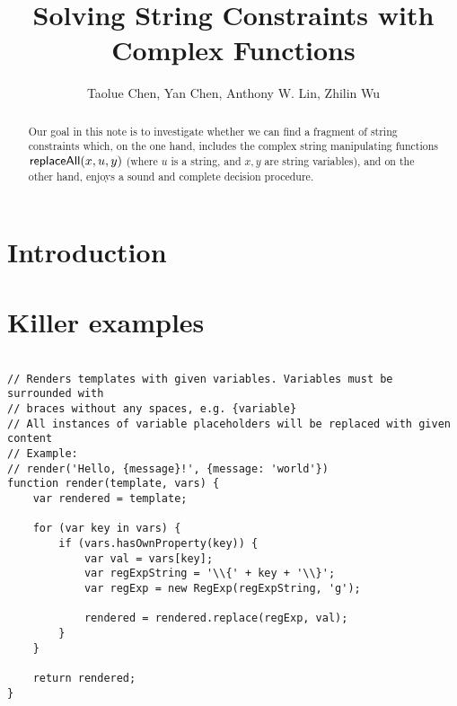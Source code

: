 \documentclass{llncs}
\title{Solving String Constraints with\\
 Complex Functions}
\author{}
\institute{}
\author{Taolue Chen, Yan Chen, Anthony W. Lin, Zhilin Wu}
\begin{document}
\maketitle


\begin{abstract}
Our goal in this note is to investigate whether we can find a fragment of string constraints which, on the one hand, includes the complex string manipulating functions $\mathsf{replaceAll}(x, u, y)$ (where $u$ is a string, and $x,y$ are string variables), and on the other hand, enjoys a sound and complete decision procedure.
\end{abstract}

\newcommand{\concat} {\circ}

\newcommand{\replace} {{\sf replace}}

\newcommand{\str} {{\sf Str}}

\newcommand{\intnum} {{\sf Int}}

\newcommand{\regexp} {{\sf RegExp}}

\newcommand{\strarr} {{\sf StringArray}}

\newcommand{\dtypes} {{\sf DataTypes}}

\newcommand{\anarr} {{\mathbb{A}}}

\section{Introduction}

\cite{LB16,TCJ16,YABI14}

\section{Killer examples}


\begin{verbatim}

// Renders templates with given variables. Variables must be surrounded with
// braces without any spaces, e.g. {variable}
// All instances of variable placeholders will be replaced with given content
// Example:
// render('Hello, {message}!', {message: 'world'})
function render(template, vars) {
    var rendered = template;

    for (var key in vars) {
        if (vars.hasOwnProperty(key)) {
            var val = vars[key];
            var regExpString = '\\{' + key + '\\}';
            var regExp = new RegExp(regExpString, 'g');

            rendered = rendered.replace(regExp, val);
        }
    }

    return rendered;
}
\end{verbatim}
\end{document}

